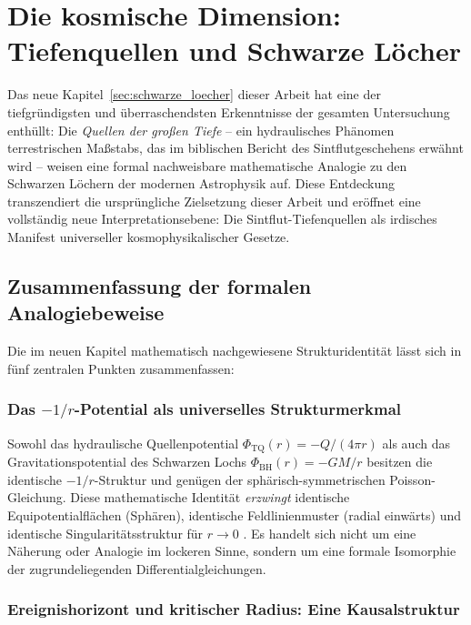 ﻿\documentclass[12pt,a4paper]{report}
\begin{document}
\section{Die kosmische Dimension: Tiefenquellen und Schwarze Löcher}
\label{sec:zusammenfassung_analogie}

Das neue Kapitel~\ref{sec:schwarze_loecher} dieser Arbeit hat eine der tiefgründigsten und überraschendsten Erkenntnisse der gesamten Untersuchung enthüllt: Die \textit{Quellen der großen Tiefe} -- ein hydraulisches Phänomen terrestrischen Maßstabs, das im biblischen Bericht des Sintflutgeschehens erwähnt wird -- weisen eine formal nachweisbare mathematische Analogie zu den Schwarzen Löchern der modernen Astrophysik auf. Diese Entdeckung transzendiert die ursprüngliche Zielsetzung dieser Arbeit und eröffnet eine vollständig neue Interpretationsebene: Die Sintflut-Tiefenquellen als irdisches Manifest universeller kosmophysikalischer Gesetze.

\subsection{Zusammenfassung der formalen Analogiebeweise}

Die im neuen Kapitel mathematisch nachgewiesene Strukturidentität lässt sich in fünf zentralen Punkten zusammenfassen:

\subsubsection{Das $-1/r$-Potential als universelles Strukturmerkmal}

Sowohl das hydraulische Quellenpotential $\Phi_{\mathrm{TQ}}(r) = -Q/(4\pi r)$ als auch das Gravitationspotential des Schwarzen Lochs $\Phi_{\mathrm{BH}}(r) = -GM/r$ besitzen die identische $-1/r$-Struktur und genügen der sphärisch-symmetrischen Poisson-Gleichung. Diese mathematische Identität \emph{erzwingt} identische Equipotentialflächen (Sphären), identische Feldlinienmuster (radial einwärts) und identische Singularitätsstruktur für $r \rightarrow 0$ \cite{misner1973,lamb1932}. Es handelt sich nicht um eine Näherung oder Analogie im lockeren Sinne, sondern um eine formale Isomorphie der zugrundeliegenden Differentialgleichungen.

\subsubsection{Ereignishorizont und kritischer Radius: Eine Kausalstruktur}
\end{document}
